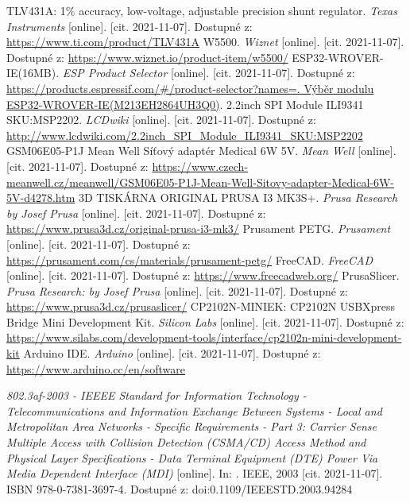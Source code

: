 \begin{thebibliography}{3}
TLV431A: 1\% accuracy, low-voltage, adjustable precision shunt regulator. \textit{Texas Instruments} [online]. [cit. 2021-11-07]. Dostupné z: \url{https://www.ti.com/product/TLV431A}
W5500. \textit{Wiznet} [online]. [cit. 2021-11-07]. Dostupné z: \url{https://www.wiznet.io/product-item/w5500/}
ESP32-WROVER-IE(16MB). \textit{ESP Product Selector} [online]. [cit. 2021-11-07]. Dostupné z: \url{https://products.espressif.com/#/product-selector?names=. Výběr modulu ESP32-WROVER-IE(M213EH2864UH3Q0)}.
2.2inch SPI Module ILI9341 SKU:MSP2202. \textit{LCDwiki} [online]. [cit. 2021-11-07]. Dostupné z:  \url{http://www.lcdwiki.com/2.2inch_SPI_Module_ILI9341_SKU:MSP2202}
GSM06E05-P1J Mean Well Síťový adaptér Medical 6W 5V. \textit{Mean Well} [online]. [cit. 2021-11-07]. Dostupné z:  \url{https://www.czech-meanwell.cz/meanwell/GSM06E05-P1J-Mean-Well-Sitovy-adapter-Medical-6W-5V-d4278.htm}
3D TISKÁRNA ORIGINAL PRUSA I3 MK3S+. \textit{Prusa Research by Josef Prusa} [online]. [cit. 2021-11-07]. Dostupné z:  \url{https://www.prusa3d.cz/original-prusa-i3-mk3/}
Prusament PETG. \textit{Prusament} [online]. [cit. 2021-11-07]. Dostupné z: \url{https://prusament.com/cs/materials/prusament-petg/}
FreeCAD. \textit{FreeCAD} [online]. [cit. 2021-11-07]. Dostupné z: \url{https://www.freecadweb.org/}
PrusaSlicer. \textit{Prusa Research: by Josef Prusa} [online]. [cit. 2021-11-07]. Dostupné z: \url{https://www.prusa3d.cz/prusaslicer/}
CP2102N-MINIEK: CP2102N USBXpress Bridge Mini Development Kit. \textit{Silicon Labs} [online]. [cit. 2021-11-07]. Dostupné z: \url{https://www.silabs.com/development-tools/interface/cp2102n-mini-development-kit}
Arduino IDE. \textit{Arduino} [online]. [cit. 2021-11-07]. Dostupné z: \url{https://www.arduino.cc/en/software}

\textit{802.3af-2003 - IEEEE Standard for Information Technology - Telecommunications and Information Exchange Between Systems - Local and Metropolitan Area Networks - Specific Requirements - Part 3: Carrier Sense Multiple Access with Collision Detection (CSMA/CD) Access Method and Physical Layer Specifications - Data Terminal Equipment (DTE) Power Via Media Dependent Interface (MDI)} [online]. In: . IEEE, 2003 [cit. 2021-11-07]. ISBN 978-0-7381-3697-4. Dostupné z: doi:0.1109/IEEESTD.2003.94284


\end{thebibliography}
